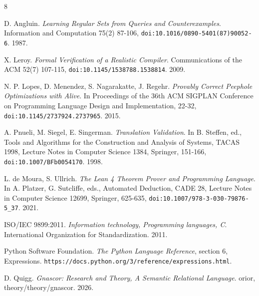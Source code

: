 \backmatter
{}
\begin{thebibliography}{8}

D. Angluin. \emph{Learning Regular Sets from Queries and Counterexamples}. Information and Computation 75(2)
87-106, \texttt{doi:10.1016/\allowbreak{}0890-5401(87)90052-6}. 1987.

X. Leroy. \emph{Formal Verification of a Realistic Compiler}. Communications of the ACM 52(7) 107-115,
\texttt{doi:10.1145/\allowbreak{}1538788.1538814}. 2009.

N. P. Lopes, D. Menendez, S. Nagarakatte, J. Regehr. \emph{Provably Correct Peephole Optimizations with Alive}. In
Proceedings of the 36th ACM SIGPLAN Conference on Programming Language Design and Implementation, 22-32,
\texttt{doi:10.1145/\allowbreak{}2737924.2737965}. 2015.

A. Pnueli, M. Siegel, E. Singerman. \emph{Translation Validation}. In B. Steffen, ed., Tools and Algorithms for the
Construction and Analysis of Systems, TACAS 1998, Lecture Notes in Computer Science 1384, Springer, 151-166,
\texttt{doi:10.1007/\allowbreak{}BFb0054170}. 1998.

L. de Moura, S. Ullrich. \emph{The Lean 4 Theorem Prover and Programming Language}. In A. Platzer, G. Sutcliffe,
eds., Automated Deduction, CADE 28, Lecture Notes in Computer Science 12699, Springer, 625-635,
\texttt{doi:10.1007/\allowbreak{}978-3-030-79876-5\_37}. 2021.

ISO/IEC 9899:2011. \emph{Information technology, Programming languages, C}. International Organization for
Standardization. 2011.

Python Software Foundation. \emph{The Python Language Reference}, section 6, Expressions.
\texttt{https://docs.python.org/3/reference/expressions.html}.

D. Quigg. \emph{Gnascor: Research and Theory, A Semantic Relational Language}. orior, theory/theory/gnascor. 2026.

\end{thebibliography}
